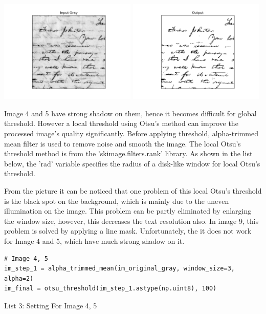 \documentclass[titlepage]{article}
\begin{document}
\begin{center}
\includegraphics[width=0.49\textwidth]{img_3_gray.png}
\includegraphics[width=0.49\textwidth]{img_3_output.png}
\end{center}

Image 4 and 5 have strong shadow on them, hence it becomes difficult for
global threshold. However a local threshold using Otsu's method can improve
the processed image's quality significantly. Before applying threshold,
alpha-trimmed mean filter is used to remove noise and smooth the image. The
local Otsu's threshold method is from the 'skimage.filters.rank' library. As
shown in the list below, the 'rad' variable specifies the radius of a
disk-like window for local Otsu's threshold. 

From the picture it can be noticed that one problem of this local Otsu's
threshold is the black spot on the background, which is mainly due to the
uneven illumination on the image. This problem can be partly eliminated by
enlarging the window size, however, this decreases the text resolution also.
In image 9, this problem is solved by applying a line mask. Unfortunately, the
it does not work for Image 4 and 5, which have much strong shadow on it.

\begin{listing}
\begin{verbatim}
# Image 4, 5 
im_step_1 = alpha_trimmed_mean(im_original_gray, window_size=3, alpha=2)
im_final = otsu_threshold(im_step_1.astype(np.uint8), 100)
\end{verbatim}
\centering
\caption{List 3: Setting For Image 4, 5}
\newline
\end{listing}
\end{document}
